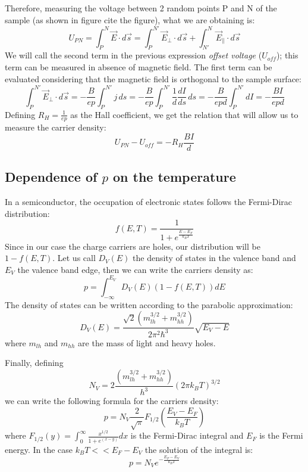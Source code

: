 \documentclass[11pt,a4paper]{article}
\begin{document}
Therefore, measuring the voltage between 2 random points P and N of the sample (as shown in figure {\tiny cite the figure}), what we are obtaining is:
\begin{equation}
U_{PN}=\int_P^N\vec{E}\cdot d\vec{s}=\int_P^{N'}\vec{E}_\perp\cdot d\vec{s}+\int_{N'}^N\vec{E}_\parallel\cdot d\vec{s}
\end{equation}
We will call the second term in the previous expression \emph{offset voltage} ($U_{off}$); this term can be measured in absence of magnetic field. The first term can be evaluated considering that the magnetic field is orthogonal to the sample surface:
\begin{equation}
\int_P^{N'}\vec{E}_\perp\cdot d\vec{s}=-\frac{B}{ep}\int_P^{N'}j\, ds=-\frac{B}{ep}\int_P^{N'}\frac{1}{d}\frac{dI}{ds}\, ds=-\frac{B}{epd}\int_P^{N'} dI=-\frac{BI}{epd}
\end{equation}
Defining $R_H=\frac{1}{ep}$ as the Hall coefficient, we get the relation that will allow us to measure the carrier density:
\begin{equation}
U_{PN}-U_{off}=-R_H\frac{BI}{d}
\end{equation}

\subsection{Dependence of $p$ on the temperature}

In a semiconductor, the occupation of electronic states follows the Fermi-Dirac distribution:
\begin{equation*}
f(E,T)=\frac{1}{1+e^{\frac{E-E_F}{k_BT}}}
\end{equation*}
Since in our case the charge carriers are holes, our distribution will be $1-f(E,T)$. Let us call $D_V(E)$ the density of states in the valence band and $E_V$ the valence band edge, then we can write the carriers density as:
\begin{equation}
p=\int_{-\infty}^{E_V}D_V(E)(1-f(E,T))dE
\end{equation}
The density of states can be written according to the parabolic approximation:
\begin{equation*}
D_V(E)=\frac{\sqrt{2}(m_{lh}^{3/2}+m_{hh}^{3/2})}{2\pi^2\hbar^3}\sqrt{E_V-E}
\end{equation*} where $m_{lh}$ and $m_{hh}$ are the mass of light and heavy holes.

Finally, defining 
\begin{equation}
N_V=2\frac{(m_{lh}^{3/2}+m_{hh}^{3/2})}{h^3}(2\pi k_BT)^{3/2}
\end{equation} we can write the following formula for the carriers density:
\begin{equation}
p=N_V\frac{2}{\sqrt{\pi}}F_{1/2}\left(\frac{E_V-E_F}{k_BT}\right)
\end{equation} where $F_{1/2}(y)=\int_0^\infty\frac{x^{1/2}}{1+e^{(x-y)}}dx$ is the Fermi-Dirac integral and $E_F$ is the Fermi energy. In the case $k_BT<<E_F-E_V$ the solution of the integral is:
\begin{equation}
p=N_Ve^{-\frac{E_F-E_V}{k_BT}}\label{eq::p}
\end{equation}
\end{document}
